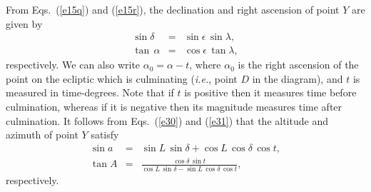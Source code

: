 From Eqs.~(\ref{e15q}) and (\ref{e15r}), the 
declination and right ascension of point $Y$ are given by
\begin{eqnarray}
\sin \delta &=& \sin\epsilon\,\sin\lambda,\\[0.5ex]
\tan\,\alpha&=&  \cos\epsilon\,\tan\lambda,
\end{eqnarray}
respectively.
We can also write $\alpha_0=\alpha-t$, where $\alpha_0$ is the
right ascension of the point on the ecliptic which is culminating ({\em i.e.}, point
$D$ in the diagram), and $t$ is measured in time-degrees. Note that if 	$t$ is positive then it measures time before culmination,
whereas if it is negative then its magnitude measures time after culmination. 
It follows from Eqs.~(\ref{e30}) and (\ref{e31})  that the altitude  and azimuth of point $Y$ satisfy
\begin{eqnarray}\label{e46}
\sin a &=& \sin L\,\sin\delta + \cos L\,\cos\delta\,\cos t,\\[0.5ex]
\tan A &=& \frac{\cos \delta\,\sin t}{\cos L\,\sin \delta - \sin L\,\cos\delta\,\cos t},
\end{eqnarray}
respectively.

